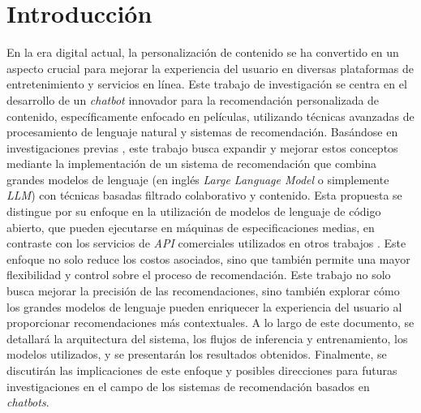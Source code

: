 \documentclass[11pt,a4paper,twoside]{thesis}
\begin{document}

\def\autor{Adrian Norberto Marino}
\def\tituloTesis{Chatbot para la recomendación personalizada de contenido}
\def\runtitulo{Resumen}
\def\runtitle{Chatbot para la recomendación personalizada de contenido}
\def\director{Roberto Abalde}

\def\lugar{Buenos Aires, Argentina, 2025}


%
\frontmatter
\pagestyle{empty}

%
%
\cleardoublepage
%
%
%
\tableofcontents
%
%
\mainmatter
\pagestyle{headings}
%
%
%
%

\chapter{Introducción}

En la era digital actual, la personalización de contenido se ha convertido en un aspecto crucial para mejorar la experiencia del usuario en diversas plataformas de entretenimiento y servicios en línea. Este trabajo de investigación se centra en el desarrollo de un \textit{chatbot} innovador para la recomendación personalizada de contenido, específicamente enfocado en películas, utilizando técnicas avanzadas de procesamiento de lenguaje natural y sistemas de recomendación. Basándose en investigaciones previas \cite{chatrec}, este trabajo busca expandir y mejorar estos conceptos mediante la implementación de un sistema de recomendación que combina grandes modelos de lenguaje (en inglés \textit{Large Language Model} o simplemente \textit{LLM}) con técnicas basadas filtrado colaborativo y contenido.
Esta propuesta se distingue por su enfoque en la utilización de modelos de lenguaje de código abierto, que pueden ejecutarse en máquinas de especificaciones medias, en contraste con los servicios de \textit{API} comerciales utilizados en otros trabajos  \cite{chatrec}. Este enfoque no solo reduce los costos asociados, sino que también permite una mayor flexibilidad y control sobre el proceso de recomendación.
Este trabajo no solo busca mejorar la precisión de las recomendaciones, sino también explorar cómo los grandes modelos de lenguaje pueden enriquecer la experiencia del usuario al proporcionar recomendaciones más contextuales.
A lo largo de este documento, se detallará la arquitectura del sistema, los flujos de inferencia y entrenamiento, los modelos utilizados, y se presentarán los resultados obtenidos. Finalmente, se discutirán las implicaciones de este enfoque y posibles direcciones para futuras investigaciones en el campo de los sistemas de recomendación basados en \textit{chatbots}.
\end{document}
